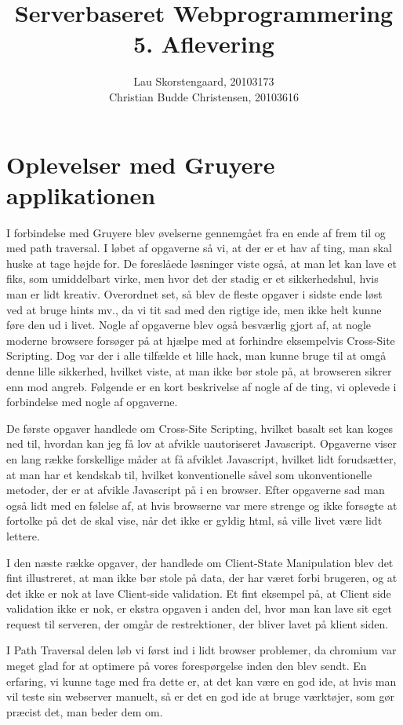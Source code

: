 \documentclass[a4paper,10pt]{article}
\author{Lau Skorstengaard, 20103173 \\Christian Budde Christensen, 20103616}
\title{Serverbaseret Webprogrammering\\5. Aflevering}
\begin{document}
\maketitle
\section*{Oplevelser med Gruyere applikationen}
I forbindelse med Gruyere blev øvelserne gennemgået fra en ende af frem til og med path traversal. I løbet af opgaverne så vi, at der er et hav af ting, man skal huske at tage højde for. De foreslåede løsninger viste også, at man let kan lave et fiks, som umiddelbart virke, men hvor det der stadig er et sikkerhedshul, hvis man er lidt kreativ. Overordnet set, så blev de fleste opgaver i sidste ende løst ved at bruge hints mv., da vi tit sad med den rigtige ide, men ikke helt kunne føre den ud i livet. Nogle af opgaverne blev også besværlig gjort af, at nogle moderne browsere forsøger på at hjælpe med at forhindre eksempelvis Cross-Site Scripting. Dog var der i alle tilfælde et lille hack, man kunne bruge til at omgå denne lille sikkerhed, hvilket viste, at man ikke bør stole på, at browseren sikrer enn mod angreb. Følgende er en kort beskrivelse af nogle af de ting, vi oplevede i forbindelse med nogle af opgaverne.

De første opgaver handlede om Cross-Site Scripting, hvilket basalt set kan koges ned til, hvordan kan jeg få lov at afvikle uautoriseret Javascript. Opgaverne viser en lang række forskellige måder at få afviklet Javascript, hvilket lidt forudsætter, at man har et kendskab til, hvilket konventionelle såvel som ukonventionelle metoder, der er at afvikle Javascript på i en browser. Efter opgaverne sad man også lidt med en følelse af, at hvis browserne var mere strenge og ikke forsøgte at fortolke på det de skal vise, når det ikke er gyldig html, så ville livet være lidt lettere.

I den næste række opgaver, der handlede om Client-State Manipulation blev det fint illustreret, at man ikke bør stole på data, der har været forbi brugeren, og at det ikke er nok at lave Client-side validation. Et fint eksempel på, at Client side validation ikke er nok, er ekstra opgaven i anden del, hvor man kan lave sit eget request til serveren, der omgår de restrektioner, der bliver lavet på klient siden. 

I Path Traversal delen løb vi først ind i lidt browser problemer, da chromium var meget glad for at optimere på vores forespørgelse inden den blev sendt. En erfaring, vi kunne tage med fra dette er, at det kan være en god ide, at hvis man vil teste sin webserver manuelt, så er det en god ide at bruge værktøjer, som gør præcist det, man beder dem om.
\end{document}
